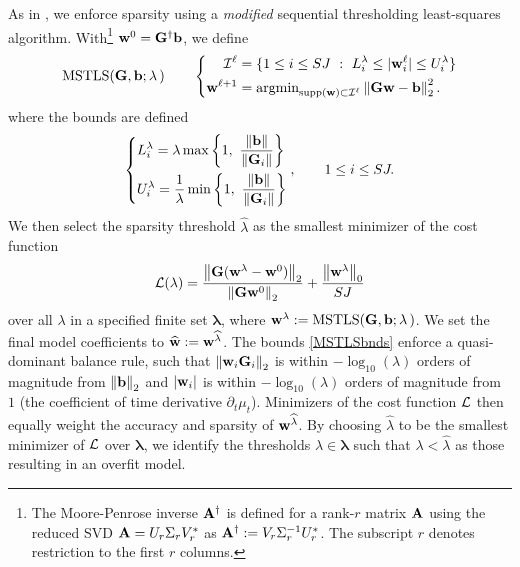 \documentclass[english,reqno]{amsart}
\begin{document}
As in \cite{messenger2020weakpde}, we enforce sparsity using a {\it modified} sequential thresholding least-squares algorithm. With\footnote{The Moore-Penrose inverse $\mathbf{A}^\dagger$ is defined for a rank-$r$ matrix $\mathbf{A}$ using the reduced SVD $\mathbf{A}=U_r\Sigma_r V^*_r$ as $\mathbf{A}^\dagger:=V_r\Sigma^{-1}_rU_r^*$. The subscript $r$ denotes restriction to the first $r$ columns.} $\mathbf{w}^0 = \mathbf{G}^\dagger \mathbf{b}$, we define
\begin{equation}\label{MSTLS1}
\text{MSTLS}(\Gbf,\bbf; \lambda\,)\qquad \begin{dcases} \hspace{0.43cm}\CalI^\ell = \{1\leq i\leq SJ\ :\ L^\lambda_i\leq|\wbf^\ell_i|\leq U^\lambda_i\} \\
\wbf^{\ell+1} = \argmin_{\supp{\wbf}\subset \CalI^\ell} \nrm{ \Gbf  \wbf-\bbf}_2^2.\end{dcases}
\end{equation}
where the bounds are defined
\begin{equation}\label{MSTLSbnds} 
\begin{dcases} L_i^\lambda =  \lambda\max\left\{1,\ \frac{\nrm{\bbf}}{\nrm{\Gbf_i}}\right\}\\
U_i^\lambda =  \frac{1}{\lambda}\min\left\{1,\ \frac{\nrm{\bbf}}{\nrm{\Gbf_i}}\right\}\end{dcases}, \qquad 1\leq i\leq SJ.
\end{equation}
We then select the sparsity threshold $\widehat{\lambda}$ as the smallest minimizer of the cost function  \begin{equation}\label{lossfcn}
{\mathcal{L}}(\lambda) = \frac{\left\Vert {\mathbf{G}(\mathbf{w}^\lambda-\mathbf{w}^0)} \right\Vert_2}{\left\Vert {\mathbf{G}\mathbf{w}^0} \right\Vert_2}+\frac{\left\Vert {\mathbf{w}^\lambda} \right\Vert_0}{SJ}
\end{equation}
over all $\lambda$ in a specified finite set $\pmb{\lambda}$, where $\mathbf{w}^\lambda:=\text{MSTLS}(\mathbf{G},\mathbf{b}; \lambda\,)$. We set the final model coefficients to ${\widehat{\mathbf{w}}}:=\mathbf{w}^{\widehat{\lambda}}$. The bounds \eqref{MSTLSbnds} enforce a quasi-dominant balance rule, such that $\left\Vert {\mathbf{w}_i\mathbf{G}_i} \right\Vert_2$ is within $-\log_{10}(\lambda)$ orders of magnitude from $\left\Vert {\mathbf{b}} \right\Vert_2$ and $|\mathbf{w}_i|$ is within $-\log_{10}(\lambda)$ orders of magnitude from $1$ (the coefficient of time derivative $\partial_t\mu_t$). Minimizers of the cost function ${\mathcal{L}}$ then equally weight the accuracy and sparsity of $\mathbf{w}^{\widehat{\lambda}}$. By choosing $\widehat{\lambda}$ to be the smallest minimizer of ${\mathcal{L}}$ over $\pmb{\lambda}$, we identify the thresholds $\lambda\in \pmb{\lambda}$ such that $\lambda<\widehat{\lambda}$ as those resulting in an overfit model.
\end{document}
